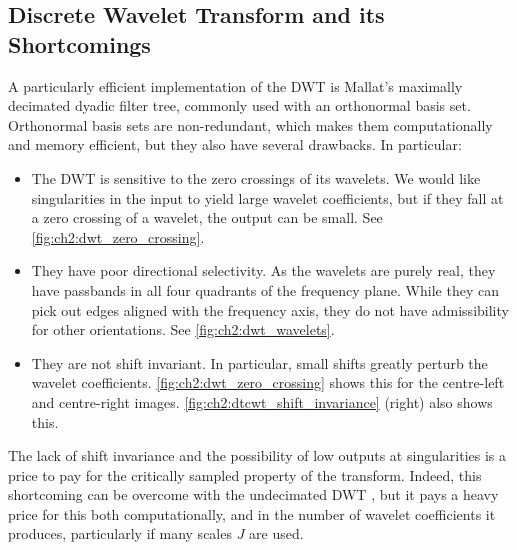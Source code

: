 \subsection{Discrete Wavelet Transform and its Shortcomings}\label{sec:ch2:dwt_problems}
  A particularly efficient implementation of the 
  DWT is Mallat's maximally decimated dyadic filter tree, commonly used with
  an orthonormal basis set.  Orthonormal basis sets are non-redundant, which
  makes them computationally and memory efficient, but they also have several
  drawbacks. In particular:

  \begin{itemize}
    \item The DWT is sensitive to the zero crossings of its wavelets. We would
      like singularities in the input to yield large wavelet coefficients, but
      if they fall at a zero crossing of a wavelet, the output can be small. See
      \autoref{fig:ch2:dwt_zero_crossing}.
    \item They have poor directional selectivity. As the wavelets are purely
      real, they have passbands in all four quadrants of the frequency plane.
      While they can pick out edges aligned with the frequency axis, they do
      not have admissibility for other orientations. See
      \autoref{fig:ch2:dwt_wavelets}.
    \item They are not shift invariant. In particular, small shifts greatly
      perturb the wavelet coefficients. \autoref{fig:ch2:dwt_zero_crossing} shows
      this for the centre-left and centre-right images.
      \autoref{fig:ch2:dtcwt_shift_invariance} (right) also shows this.
  \end{itemize}

  The lack of shift invariance and the possibility of low outputs at
  singularities is a price to pay for the critically sampled property of the
  transform. Indeed, this shortcoming can be overcome with the undecimated DWT
  \citep{mallat_wavelet_1998,coifman_translation-invariant_1995}, 
  but it pays a heavy price for this both
  computationally, and in the number of wavelet coefficients it produces,
  particularly if many scales $J$ are used. 

